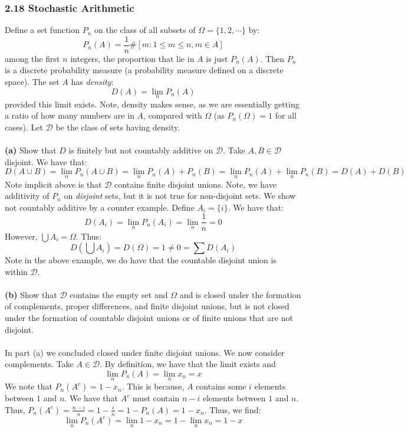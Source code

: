 \documentclass[12pt,a4paper]{article}
\newcommand{\1}[1]{\mathbbm{1}\left\{ #1 \right\}}
\newcommand{\dcal}{\mathcal{D}}
\begin{document}
\subsubsection{2.18 Stochastic Arithmetic} Define a set function $P_n$ on the class of all subsets of $\Omega = \{1, 2, \cdots\}$ by:
$$
	P_n(A) = \frac{1}{n} \#\left[m : 1 \leq m \leq n, m \in A\right]
$$
among the first $n$ integers, the proportion that lie in $A$ is just $P_n(A)$. Then $P_n$ is a discrete probability measure (a probability measure defined on a discrete space). The set $A$ has \textit{density}:
$$
	D(A) = \lim_n P_n(A)
$$
provided this limit exists. Note, density makes sense, as we are essentially getting a ratio of how many numbers are in $A$, compared with $\Omega$ (as $P_n(\Omega) = 1$ for all cases). Let $\dcal$ be the class of sets having density.
\\\\
\textbf{(a)} Show that $D$ is finitely but not countably additive on $\dcal$. Take $A,B \in \dcal$ disjoint. We have that:
$$
	D(A \cup B) = \lim_n P_n(A \cup B) = \lim_n P_n(A) + P_n(B) = \lim_n P_n(A) + \lim_n P_n(B) = D(A) + D(B)
$$
Note implicit above is that $\dcal$ contains finite disjoint unions. Note, we have additivity of $P_n$ on \textit{disjoint} sets, but it is not true for non-disjoint sets. We show not countably additive by a counter example. Define $A_i = \{i\}$. We have that:
$$
	D(A_i) = \lim_n P_n(A_i) = \lim_n \frac{1}{n} = 0
$$
However, $\bigcup A_i = \Omega$. Thus:
$$
	D\left(\bigcup A_i\right) = D(\Omega) = 1 \neq 0 = \sum D(A_i)
$$
Note in the above example, we do have that the countable disjoint union is within $\dcal$.
\\\\
\textbf{(b)} Show that $\dcal$ contains the empty set and $\Omega$ and is closed under the formation of complements, proper differences, and finite disjoint unions, but is not closed under the formation of countable disjoint unions or of finite unions that are not disjoint.
\\\\
In part (a) we concluded closed under finite disjoint unions. We now consider complements. Take $A \in \dcal$. By definition, we have that the limit exists and
$$
	\lim_n P_n(A) = \lim_n x_n = x
$$
We note that $P_n(A^c) = 1 - x_n$. This is because, $A$ contains some $i$ elements between $1$ and $n$. We have that $A^c$ must contain $n - i$ elements between $1$ and $n$. Thus, $P_n(A^c) = \frac{n - i}{n} = 1 - \frac{i}{n} = 1 - P_n(A) = 1 - x_n$. Thus, we find:
$$
	\lim_n P_n(A^c) = \lim_n 1 - x_n = 1 - \lim_n x_n = 1 - x
$$
\end{document}
